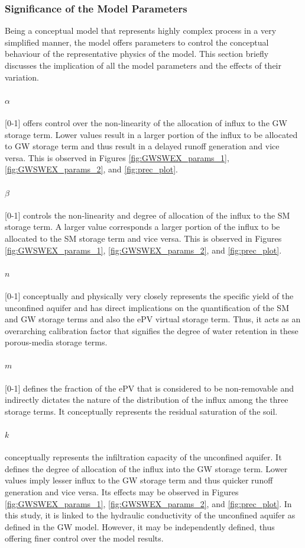 \subsubsection{Significance of the Model Parameters}
Being a conceptual model that represents highly complex process in a very simplified manner, the model offers parameters to control the conceptual behaviour of the representative physics of the model. This section briefly discusses the implication of all the model parameters and the effects of their variation.
\paragraph*{$\alpha$} [0-1]
offers control over the non-linearity of the allocation of influx to the GW storage term. Lower values result in a larger portion of the influx to be allocated to GW storage term and thus result in a delayed runoff generation and vice versa. This is observed in Figures \ref{fig:GWSWEX_params_1}, \ref{fig:GWSWEX_params_2}, and \ref{fig:prec_plot}.
\paragraph*{$\beta$} [0-1]
controls the non-linearity and degree of allocation of the influx to the SM storage term. A larger value corresponds a larger portion of the influx to be allocated to the SM storage term and vice versa. This is observed in Figures \ref{fig:GWSWEX_params_1}, \ref{fig:GWSWEX_params_2}, and \ref{fig:prec_plot}.
\paragraph*{$n$} [0-1]
conceptually and physically very closely represents the specific yield of the unconfined aquifer and has direct implications on the quantification of the SM and GW storage terms and also the ePV virtual storage term. Thus, it acts as an overarching calibration factor that signifies the degree of water retention in these porous-media storage terms.
\paragraph*{$m$} [0-1]
defines the fraction of the ePV that is considered to be non-removable and indirectly dictates the nature of the distribution of the influx among the three storage terms. It conceptually represents the residual saturation of the soil.
\paragraph*{$k$}
conceptually represents the infiltration capacity of the unconfined aquifer. It defines the degree of allocation of the influx into the GW storage term. Lower values imply lesser influx to the GW storage term and thus quicker runoff generation and vice versa. Its effects may be observed in Figures \ref{fig:GWSWEX_params_1}, \ref{fig:GWSWEX_params_2}, and \ref{fig:prec_plot}. In this study, it is linked to the hydraulic conductivity of the unconfined aquifer as defined in the GW model. However, it may be independently defined, thus offering finer control over the model results.
